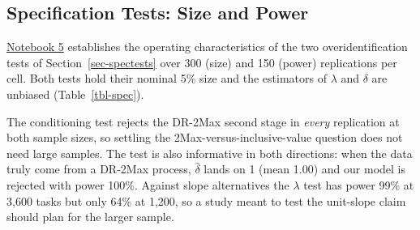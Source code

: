 \documentclass[
  letterpaper,
  DIV=11,
  numbers=noendperiod]{scrartcl}
\theoremstyle{plain}
\theoremstyle{plain}
\theoremstyle{plain}
\theoremstyle{remark}
\begin{document}
\subsection{Specification Tests: Size and
Power}\label{sec-sim-spectests}

\href{notebooks/05-specification-tests.qmd}{Notebook 5} establishes the
operating characteristics of the two overidentification tests of
Section~\ref{sec-spectests} over 300 (size) and 150 (power) replications
per cell. Both tests hold their nominal 5\% size and the estimators of
\(\lambda\) and \(\delta\) are unbiased (Table~\ref{tbl-spec}).

The conditioning test rejects the DR-2Max second stage in \emph{every}
replication at both sample sizes, so settling the
2Max-versus-inclusive-value question does not need large samples. The
test is also informative in both directions: when the data truly come
from a DR-2Max process, \(\hat\delta\) lands on 1 (mean 1.00) and our
model is rejected with power 100\%. Against slope alternatives the
\(\lambda\) test has power 99\% at 3,600 tasks but only 64\% at 1,200,
so a study meant to test the unit-slope claim should plan for the larger
sample.
\end{document}
